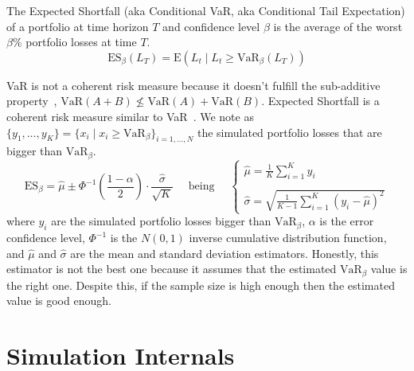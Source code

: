 \documentclass[11pt,fleqn]{book} %
\begin{document}
\begin{definition}
	The Expected Shortfall (aka Conditional VaR, aka Conditional Tail 
	Expectation) of a portfolio at time horizon $T$ and 
	confidence level $\beta$ is the average of the worst $\beta\%$ portfolio 
	losses at time $T$.
	\begin{displaymath}
		\text{ES}_\beta(L_T) = \text{E}(L_t \mid L_t \ge \text{VaR}_\beta(L_T))
	\end{displaymath}
\end{definition}

VaR is not a coherent risk measure because it doesn't fulfill the sub-additive 
property~\cite{var:varbad}, $\text{VaR}(A+B) \nleq \text{VaR}(A)+\text{VaR}(B)$. 
Expected Shortfall is a coherent risk measure similar to VaR~\cite{var:eshortfall}.
We note as 
$\{y_1, \ldots, y_K\} = \{x_i \mid x_i \ge \text{VaR}_{\beta} \}_{i=1,\dots,N}$ 
the simulated portfolio losses that are bigger than $\text{VaR}_{\beta}$.
\begin{displaymath}
	\text{ES}_{\beta} = \widehat{\mu} \pm \Phi^{-1}\left(\frac{1-\alpha}{2}\right) \cdot \frac{\widehat{\sigma}}{\sqrt{K}}
	\quad \text{ being } \quad
	\left\{
	\begin{array}{l}
		\displaystyle
		\widehat{\mu} = \frac{1}{K} \sum_{i=1}^{K} y_i \\
		\\
		\displaystyle
		\widehat{\sigma} =
		\sqrt{\frac{1}{K-1} \sum_{i=1}^{K} \left( y_i - \widehat{\mu} \right)^2}
	\end{array}
	\right.
\end{displaymath}
where $y_i$ are the simulated portfolio losses bigger than $\text{VaR}_{\beta}$, 
$\alpha$ is the error confidence level, $\Phi^{-1}$ is the $N(0,1)$ 
inverse cumulative distribution function, and $\widehat{\mu}$ and 
$\widehat{\sigma}$ are the mean and standard deviation estimators.
Honestly, this estimator is not the best one because it assumes that
the estimated $\text{VaR}_{\beta}$ value is the right one. Despite this, 
if the sample size is high enough then the estimated value is good enough.

\section{Simulation Internals}
\end{document}
